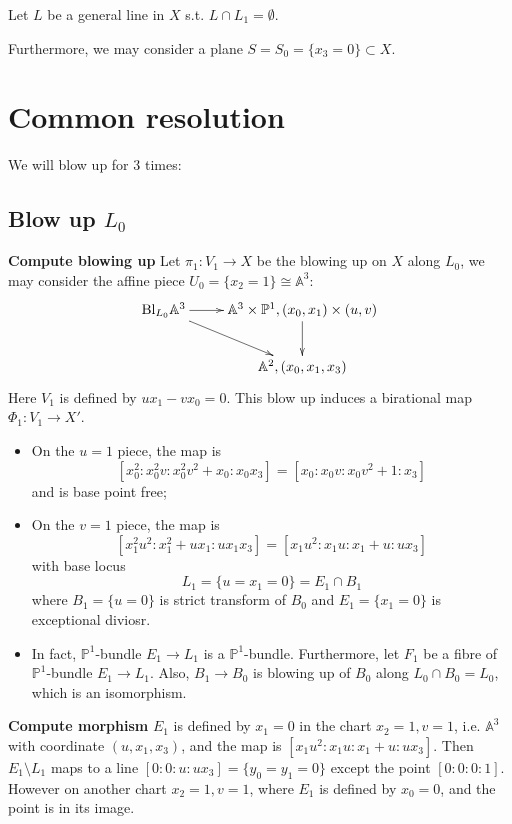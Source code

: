 \documentclass{article}
\begin{document}
Let $ L $ be a general line in $ X $ s.t. $ L\cap L_1=\emptyset $.

Furthermore, we may consider a plane $ S=S_0=\{x_3=0\}\subset X $.
\section{Common resolution}
We will blow up for 3 times:
\subsection{Blow up $ L_0 $}
\textbf{Compute blowing up}
Let $ \pi_1:V_1\to X  $ be the blowing up on $ X $ along $ L_0 $, we may consider the affine piece $ U_0=\{x_2=1\}\cong \mathbb{A}^3 $:
\[ \xymatrix{
	\mathrm{Bl}_{L_0}\mathbb{A}^3\ar[r]\ar[rd]&\mathbb{A}^3\times \mathbb{P}^1,(x_0,x_1)\times (u,v)\ar[d]\\
	&\mathbb{A}^2,(x_0,x_1,x_3)	} \]
Here $ V_1 $ is defined by $ ux_1-vx_0=0 $. This blow up induces a birational map $ \Phi_1:V_1\to X' $.
\begin{itemize}
	\item On the $ u=1 $ piece, the map is
	\[ [x_0^2:x_0^2v:x_0^2v^2+x_0:x_0x_3]=[x_0:x_0v:x_0v^2+1:x_3] \]
	and is base point free;
	\item On the $ v=1 $ piece, the map is
	\[
	[x_1^2u^2:x_1^2+ux_1:ux_1x_3]=[x_1u^2:x_1u:x_1+u:ux_3]
	\]
	with base locus
	\[ L_1=\{u=x_1=0\}=E_1\cap B_1 \]
	where $ B_1=\{u=0\} $ is strict transform of $ B_0 $ and $ E_1=\{x_1=0\} $ is exceptional diviosr.
	\item In fact, $ \mathbb{P}^1 $-bundle $ E_1\to L_1 $ is a $ \mathbb{P}^1 $-bundle. Furthermore, let  $ F_1 $ be a fibre of $ \mathbb{P}^1 $-bundle $ E_1\to L_1 $. Also, $ B_1\to B_0 $ is blowing up of $ B_0 $ along $ L_0\cap B_0=L_0 $, which is an isomorphism.
\end{itemize}
\textbf{Compute morphism}
$ E_1 $ is defined by $ x_1=0 $ in the chart $ x_2=1,v=1 $, i.e. $ \mathbb{A}^3 $ with coordinate $ (u,x_1,x_3) $, and the map is $ [x_1u^2:x_1u:x_1+u:ux_3] $. Then $ E_1\setminus L_1 $ maps to a line $ [0:0:u:ux_3]=\{y_0=y_1=0\} $ except the point $ [0:0:0:1] $. However on another chart $ x_2=1,v=1 $, where $ E_1 $ is defined by $ x_0=0 $, and the point is in its image.
\end{document}
